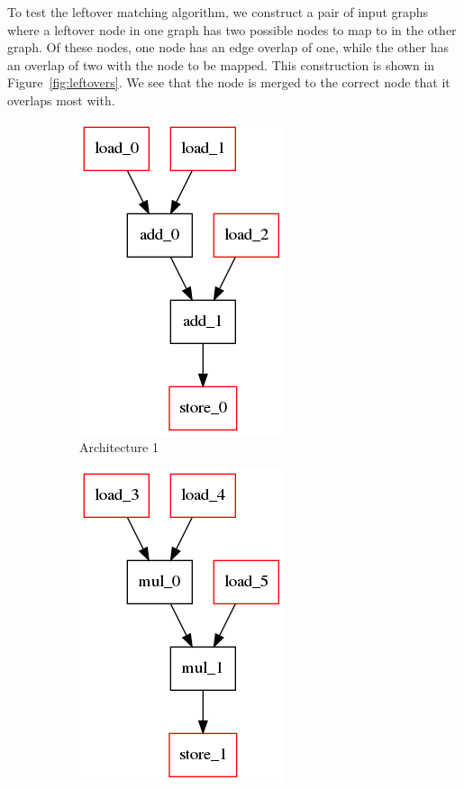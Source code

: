 To test the leftover matching algorithm, we construct a pair of input graphs where a leftover node in one graph has two possible nodes to map to in the other graph. Of these nodes, one node has an edge overlap of one, while the other has an overlap of two with the node to be mapped. This construction is shown in Figure~\ref{fig:leftovers}. We see that the node is merged to the correct node that it overlaps most with.

\begin{figure}[!htb]
  \begin{subfigure}[t]{0.33\textwidth}
    \centering
    \includegraphics[scale=0.5]{graphs/test_multiple1.png}
    \caption{Architecture 1}
    \label{fig:multiple:a}
  \end{subfigure}
  \begin{subfigure}[t]{0.33\textwidth}
    \centering
    \includegraphics[scale=0.5]{graphs/test_multiple2.png}

\end{subfigure}
\end{figure}
